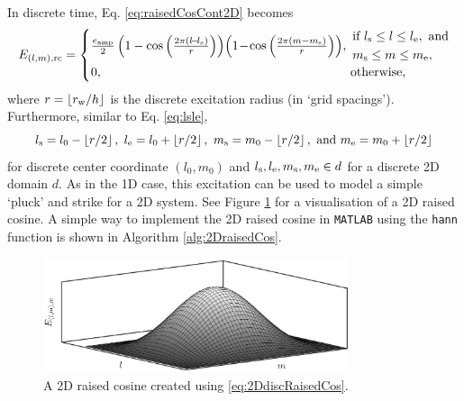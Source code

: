 In discrete time, Eq. \eqref{eq:raisedCosCont2D} becomes
\begin{equation}\label{eq:2DdiscRaisedCos}
    E_{(l,m), \text{rc}} = 
    \begin{cases}
        \!\frac{e_\text{amp}}{2}\left(1 - \cos\left(\frac{2\pi (l \!-\! l_\stxt)}{r}\right)\right)\!\left(1\! -\! \cos\left(\frac{2\pi (m - m_\stxt)}{r}\right)\right)\!, & \!\!\!\!
        \begin{aligned}
            &\text{if } l_\stxt \leq l \leq l_\etxt, \text{ and}\\
            & m_\stxt \leq m \leq m_\etxt,
        \end{aligned}\\
        \!0, &\!\!\!\! \text{otherwise},
    \end{cases}
\end{equation}
where $r = \floor[r_\text{w} / h]$ is the discrete excitation radius (in `grid spacings'). Furthermore, similar to Eq. \eqref{eq:lsle},
\begin{equation}
    l_\text{s} = l_0 - \floor[r/2],\ l_\etxt = l_0 + \floor[r/2],\ m_\text{s} = m_0 - \floor[r/2], \ \text{and} \ m_\etxt = m_0 + \floor[r/2]
\end{equation}
for discrete center coordinate $(l_0, m_0)$ and $l_{\text{s}}, l_{\text{e}}, m_{\text{s}},  m_\text{e}\in d$ for a discrete 2D domain $d$. 
As in the 1D case, this excitation can be used to model a simple `pluck' and strike for a 2D system. See Figure \ref{fig:2DHann} for a visualisation of a 2D raised cosine. A simple way to implement the 2D raised cosine in \texttt{MATLAB} using the \texttt{hann} function is shown in Algorithm \ref{alg:2DraisedCos}.
\def\figWidth{0.8}
\begin{figure}[b]
    \centering
    \includegraphics[width=\figWidth\textwidth]{figures/exciters/physInsp/2dHann.eps}
    \caption{A 2D raised cosine created using \ref{eq:2DdiscRaisedCos}.\label{fig:2DHann}}
\end{figure}

